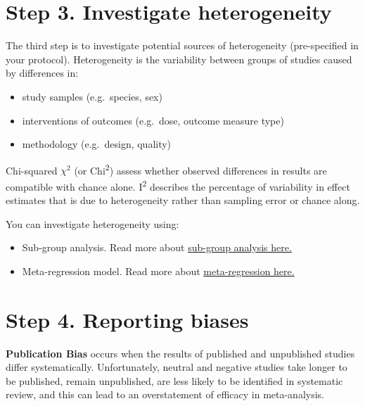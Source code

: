 \documentclass[
]{book}
\providecommand{\tightlist}{%
  \setlength{\itemsep}{0pt}\setlength{\parskip}{0pt}}
\begin{document}
\hypertarget{step-3.-investigate-heterogeneity}{%
\section{Step 3. Investigate heterogeneity}\label{step-3.-investigate-heterogeneity}}

The third step is to investigate potential sources of heterogeneity (pre-specified in your protocol). Heterogeneity is the variability between groups of studies caused by differences in:

\begin{itemize}
\tightlist
\item
  study samples (e.g.~species, sex)
\item
  interventions of outcomes (e.g.~dose, outcome measure type)
\item
  methodology (e.g.~design, quality)
\end{itemize}

Chi-squared \(\chi^2\) (or Chi\textsuperscript{2}) assess whether observed differences in results are compatible with chance alone.
I\textsuperscript{2} describes the percentage of variability in effect estimates that is due to heterogeneity rather than sampling error or chance along.

You can investigate heterogeneity using:

\begin{itemize}
\tightlist
\item
  Sub-group analysis. Read more about \href{https://bookdown.org/MathiasHarrer/Doing_Meta_Analysis_in_R/subgroup.html}{sub-group analysis here.}
\item
  Meta-regression model. Read more about \href{https://bookdown.org/MathiasHarrer/Doing_Meta_Analysis_in_R/metareg.html}{meta-regression here.}
\end{itemize}

\hypertarget{step-4.-reporting-biases}{%
\section{Step 4. Reporting biases}\label{step-4.-reporting-biases}}

\textbf{Publication Bias} occurs when the results of published and unpublished studies differ systematically. Unfortunately, neutral and negative studies take longer to be published, remain unpublished, are less likely to be identified in systematic review, and this can lead to an overstatement of efficacy in meta-analysis.
\end{document}
